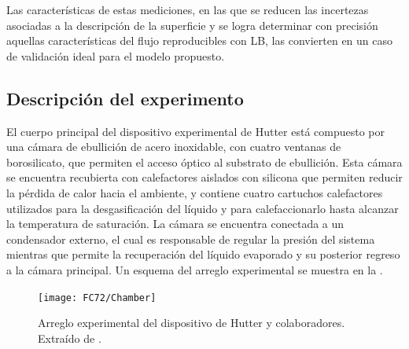Las caracter\'isticas de estas mediciones, en las que se reducen las incertezas asociadas a la descripci\'on de la superficie y se logra determinar con precisi\'on aquellas caracter\'isticas del flujo reproducibles con LB, las convierten en un caso de validaci\'on ideal para el modelo propuesto.




\subsection{Descripci\'on del experimento}

El cuerpo principal del dispositivo experimental de Hutter \cite{hutter_experimental_2010} est\'a compuesto por una c\'amara de ebullici\'on de acero inoxidable, con cuatro ventanas de borosilicato, que permiten el acceso \'optico al substrato de ebullici\'on. Esta c\'amara se encuentra recubierta con calefactores aislados con silicona que permiten reducir la p\'erdida de calor hacia el ambiente, y contiene cuatro cartuchos calefactores utilizados para la desgasificaci\'on del l\'iquido y para calefaccionarlo hasta alcanzar la temperatura de saturaci\'on. La c\'amara se encuentra conectada a un condensador externo, el cual es responsable de regular la presi\'on del sistema mientras que permite la recuperaci\'on del l\'iquido evaporado y su posterior regreso a la c\'amara principal. Un esquema del arreglo experimental se muestra en la .

\begin{figure}[ht]
	\centering
	\texttt{[image: FC72/Chamber]}
	\caption{Arreglo experimental del dispositivo de Hutter y colaboradores. Extra\'ido de \cite{hutter_experimental_2010}.}
	\label{fig:chamber}
\end{figure}


%


